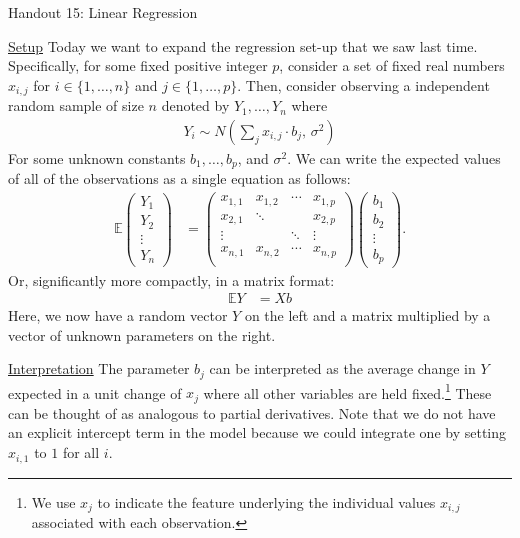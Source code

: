 \documentclass{tufte-handout}
\begin{document}
\justify

{\LARGE Handout 15: Linear Regression}

\vspace*{18pt}

\noindent
\underline{Setup}
Today we want to expand the regression set-up that we saw last time.
Specifically, for some fixed positive integer $p$, consider a set of
fixed real numbers $x_{i, j}$ for $i \in \{1, \ldots, n\}$ and
$j \in \{1, \ldots, p\}$. Then, consider observing a independent random
sample of size $n$ denoted by $Y_1, \ldots, Y_n$ where
\begin{align*}
Y_i \sim N(\sum_{j} x_{i, j} \cdot b_j, \, \sigma^2)
\end{align*}
For some unknown constants $b_1, \ldots, b_p$, and $\sigma^2$. We can
write the expected values of all of the observations as a single equation
as follows:
\begin{align*}
\mathbb{E} \left(\begin{array}{c}Y_1\\ Y_2\\ \vdots\\ Y_n\end{array}\right) &=
  \left(\begin{array}{cccc}x_{1,1}&x_{1,2}&\cdots&x_{1,p}\\
                           x_{2,1}&\ddots&&x_{2,p}\\
                           \vdots&&\ddots&\vdots\\
                           x_{n,1}&x_{n,2}&\cdots&x_{n,p}\\\end{array}\right)
  \left(\begin{array}{c}b_1\\ b_2\\ \vdots\\ b_p\end{array}\right).
\end{align*}
Or, significantly more compactly, in a matrix format:
\begin{align*}
\mathbb{E} Y &= X b
\end{align*}
Here, we now have a random vector $Y$ on the left and a matrix multiplied
by a vector of unknown parameters on the right.

\vspace*{12pt}

\noindent
\underline{Interpretation}
The parameter $b_j$ can be interpreted as the average change in $Y$
expected in a unit change of $x_{j}$ where all other variables are held
fixed.\footnote{We use $x_{j}$ to indicate the feature underlying the
individual values $x_{i,j}$ associated with each observation.} These
can be thought of as analogous to partial derivatives. Note that we do
not have an explicit intercept term in the model because we could integrate
one by setting $x_{i,1}$ to $1$ for all $i$.
\end{document}
